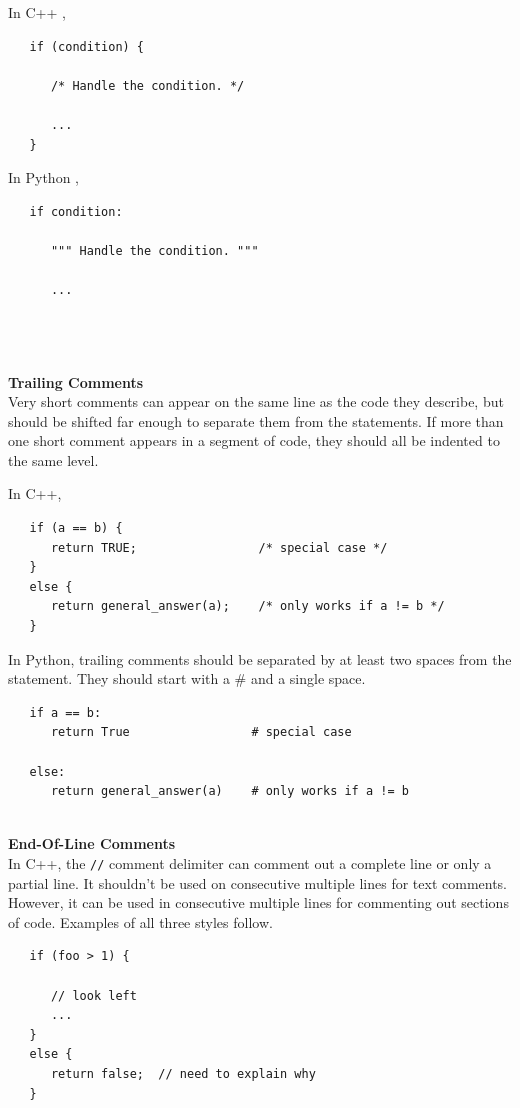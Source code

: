 \documentclass{CSSRforAfrica}
\newcommand{\blank}{~\\}
\begin{document}
\begin{appendices}
In C++ ,
{\small
\begin{verbatim}
   if (condition) {

      /* Handle the condition. */

      ...
   }
\end{verbatim}
}

In Python , 
{\small
\begin{verbatim}
   if condition:

      """ Handle the condition. """

      ...
   
\end{verbatim}
}


\blank
~
\blank
{\bf Trailing Comments}
~
\blank
Very short comments can appear on the same line as the code they describe, 
but should be shifted far enough to separate them from the statements.
If more than one short comment appears in a segment of code, they should all
be indented to the same level.

\newpage
\noindent
In C++,
{\small
\begin{verbatim}
   if (a == b) {
      return TRUE;                 /* special case */
   }
   else {
      return general_answer(a);    /* only works if a != b */
   }
\end{verbatim}
}

\noindent
In Python, trailing comments should be separated by at least two spaces from the statement. They should start with a \# and a single space.
{\small
\begin{verbatim}
   if a == b: 
      return True                 # special case

   else:
      return general_answer(a)    # only works if a != b 

\end{verbatim}
}


~
\blank
{\bf End-Of-Line Comments}
~
\blank
In C++, the {\small \verb+//+} comment delimiter can comment out a complete line or only a partial line.
It shouldn't be used on consecutive multiple lines for text comments.  However, it can be used
in consecutive multiple lines for commenting out sections of code.  Examples of all three styles
follow.

{\small
\begin{verbatim}
   if (foo > 1) {

      // look left
      ...
   }
   else {
      return false;  // need to explain why
   }
\end{verbatim}
}


\end{appendices}
\end{document}
